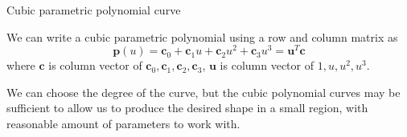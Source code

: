 \documentclass[10pt,a4paper]{article}
\begin{document}
\begin{enumerate}
		{\large \item Cubic parametric polynomial curve}
		
		We can write a cubic parametric polynomial using a row and column matrix as $$ \textbf{p}(u) = \textbf{c}_0 + \textbf{c}_1 u + \textbf{c}_2 u^2 + \textbf{c}_3 u^3 = \textbf{u}^T \textbf{c} $$ where $ \textbf{c} $ is column vector of $ \textbf{c}_0, \textbf{c}_1, \textbf{c}_2, \textbf{c}_3 $, $ \textbf{u} $ is column vector of $ 1, u, u^2, u^3 $.
		
		We can choose the degree of the curve, but the cubic polynomial curves may be sufficient to allow us to produce the desired shape in a small region, with reasonable amount of parameters to work with.
	\end{enumerate}
\end{document}

